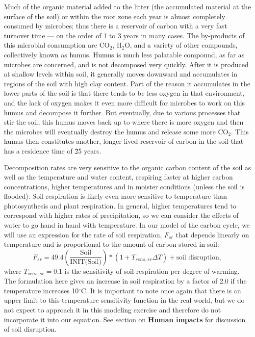 \documentclass[11pt,letterpaper]{article}
\begin{document}
Much of the organic material added to the litter (the accumulated material at the surface of the soil) or within the root zone each year is almost completely consumed by microbes; thus there is a reservoir of carbon with a very fast turnover time --- on the order of 1 to 3 years in many cases. The by-products of this microbial consumption are CO$_2$, H$_2$O, and a
variety of other compounds, collectively known as humus. Humus is much less palatable compound, as far as microbes are concerned, and is not decomposed very quickly. After it is produced at shallow levels within soil, it generally moves downward and accumulates in regions of the soil with high clay content. Part of the reason it accumulates in the lower parts of the soil is that there tends to be less oxygen in that environment, and the lack of oxygen makes it even more difficult for microbes to work on this humus and decompose it further. But eventually, due to various processes that stir the soil, this humus moves back up to where there is more oxygen and then the microbes will eventually destroy the humus and release some more CO$_2$. This humus then constitutes another, longer-lived reservoir of carbon in the soil that has a residence time of \~25 years.

Decomposition rates are very sensitive to the organic carbon content of the soil as well as the temperature and water content, respiring faster at higher carbon concentrations, higher temperatures and in moister conditions (unless the soil is flooded). Soil respiration is likely even more sensitive to temperature than photosynthesis and plant respiration. In general, higher temperatures tend to correspond with higher rates of precipitation, so we can consider the effects of water to go hand in hand with temperature. In our model of the carbon cycle, we will use an expression for the rate of soil respiration, $F_{sr}$ that depends linearly on temperature and is proportional to the amount of carbon stored in soil:
\begin{equation}
F_{sr} = 49.4\left(\frac{\mbox{Soil}}{\mbox{INIT(Soil)}}\right)*(1+T_{sens,sr}\Delta{T})+\mbox{soil disruption},
\end{equation}
where $T_{sens,sr}=0.1$ is the sensitivity of soil respiration per degree of warming. The formulation here gives an increase in soil respiration by a factor of 2.0 if the temperature increases 10$^\circ$C. It is important to note once again that there is an upper limit to this temperature sensitivity function in the real world, but we do not expect to approach it in this modeling exercise and therefore do not incorporate it into our equation. See section on \textbf{Human impacts} for discussion of soil disruption.
\end{document}
